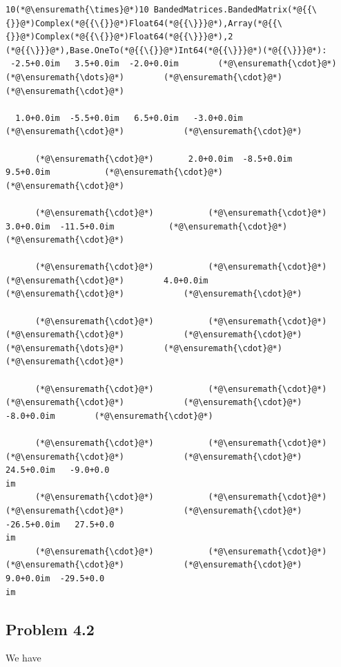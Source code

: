 \documentclass[12pt,a4paper]{article}
\begin{document}
\begin{lstlisting}
10(*@\ensuremath{\times}@*)10 BandedMatrices.BandedMatrix(*@{{\{}}@*)Complex(*@{{\{}}@*)Float64(*@{{\}}}@*),Array(*@{{\{}}@*)Complex(*@{{\{}}@*)Float64(*@{{\}}}@*),2
(*@{{\}}}@*),Base.OneTo(*@{{\{}}@*)Int64(*@{{\}}}@*)(*@{{\}}}@*):
 -2.5+0.0im   3.5+0.0im  -2.0+0.0im        (*@\ensuremath{\cdot}@*)      (*@\ensuremath{\dots}@*)        (*@\ensuremath{\cdot}@*)            (*@\ensuremath{\cdot}@*)  
  
  1.0+0.0im  -5.5+0.0im   6.5+0.0im   -3.0+0.0im           (*@\ensuremath{\cdot}@*)            (*@\ensuremath{\cdot}@*)  
  
      (*@\ensuremath{\cdot}@*)       2.0+0.0im  -8.5+0.0im    9.5+0.0im           (*@\ensuremath{\cdot}@*)            (*@\ensuremath{\cdot}@*)  
  
      (*@\ensuremath{\cdot}@*)           (*@\ensuremath{\cdot}@*)       3.0+0.0im  -11.5+0.0im           (*@\ensuremath{\cdot}@*)            (*@\ensuremath{\cdot}@*)  
  
      (*@\ensuremath{\cdot}@*)           (*@\ensuremath{\cdot}@*)           (*@\ensuremath{\cdot}@*)        4.0+0.0im           (*@\ensuremath{\cdot}@*)            (*@\ensuremath{\cdot}@*)  
  
      (*@\ensuremath{\cdot}@*)           (*@\ensuremath{\cdot}@*)           (*@\ensuremath{\cdot}@*)            (*@\ensuremath{\cdot}@*)      (*@\ensuremath{\dots}@*)        (*@\ensuremath{\cdot}@*)            (*@\ensuremath{\cdot}@*)  
  
      (*@\ensuremath{\cdot}@*)           (*@\ensuremath{\cdot}@*)           (*@\ensuremath{\cdot}@*)            (*@\ensuremath{\cdot}@*)          -8.0+0.0im        (*@\ensuremath{\cdot}@*)  
  
      (*@\ensuremath{\cdot}@*)           (*@\ensuremath{\cdot}@*)           (*@\ensuremath{\cdot}@*)            (*@\ensuremath{\cdot}@*)          24.5+0.0im   -9.0+0.0
im
      (*@\ensuremath{\cdot}@*)           (*@\ensuremath{\cdot}@*)           (*@\ensuremath{\cdot}@*)            (*@\ensuremath{\cdot}@*)         -26.5+0.0im   27.5+0.0
im
      (*@\ensuremath{\cdot}@*)           (*@\ensuremath{\cdot}@*)           (*@\ensuremath{\cdot}@*)            (*@\ensuremath{\cdot}@*)           9.0+0.0im  -29.5+0.0
im
\end{lstlisting}


\subsection{Problem 4.2}
We have
\end{document}
